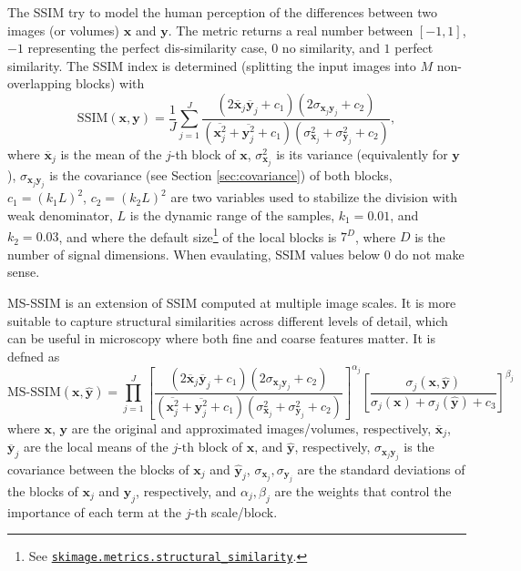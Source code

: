 The SSIM \cite{wang2004image} try to model the human perception of the
differences between two images (or volumes) $\mathbf{x}$ and
$\mathbf{y}$. The metric returns a real number between $[-1, 1]$, $-1$
representing the perfect dis-similarity case, $0$ no similarity, and
$1$ perfect similarity. The SSIM index is determined (splitting the
input images into $M$ non-overlapping blocks) with
\begin{equation}
  \text{SSIM}(\mathbf{x}, \mathbf{y}) = \frac{1}{J} \sum_{j=1}^J \frac{(2\overline{\mathbf{x}}_j \overline{\mathbf{y}}_j + c_1)(2\sigma_{\mathbf{x}_j \mathbf{y}_j} + c_2)}{(\overline{\mathbf{x}_j^2} + \overline{\mathbf{y}_j^2} + c_1)(\sigma^2_{\mathbf{x}_j} + \sigma^2_{\mathbf{y}_j} + c_2)},
\end{equation}
where $\overline{\mathbf x}_j$ is the mean of the $j$-th block of
$\mathbf{x}$, $\sigma^2_{\mathbf{x}_j}$ is its variance (equivalently
for $\mathbf{y}$), $\sigma_{\mathbf{x}_j\mathbf{y}_j}$ is the
covariance (see Section \ref{sec:covariance}) of both blocks,
$c_1=(k_1L)^2$, $c_2=(k_2L)^2$ are two variables used to stabilize the
division with weak denominator, $L$ is the dynamic range of the
samples, $k_1=0.01$, and $k_2=0.03$, and where the default
size\footnote{See
  \href{https://scikit-image.org/docs/stable/api/skimage.metrics.html\#skimage.metrics.structural_similarity}{\texttt{skimage.metrics.structural\_similarity}}.}
of the local blocks is $7^D$, where $D$ is the number of signal
dimensions. When evaulating, SSIM values below $0$ do not make
sense.

MS-SSIM \cite{wang2003multiscale} is an extension of SSIM computed at
multiple image scales. It is more suitable to capture structural
similarities across different levels of detail, which can be useful in
microscopy where both fine and coarse features matter. It is defned as
\begin{equation}
  \text{MS-SSIM}(\mathbf{x}, \hat{\mathbf{y}}) = \prod_{j=1}^{J} \left[ \frac{(2 \overline{\mathbf{x}}_j \overline{\mathbf{y}}_j + c_1)(2\sigma_{\mathbf{x}_j \mathbf{y}_j} + c_2)}{(\overline{\mathbf{x}_j^2} + \overline{\mathbf{y}_j^2} + c_1)(\sigma^2_{\mathbf{x}_j} + \sigma^2_{\mathbf{y}_j} + c_2)} \right]^{\alpha_j} \left[ \frac{\sigma_j(\mathbf{x}, \hat{\mathbf{y}})}{\sigma_j(\mathbf{x}) + \sigma_j(\hat{\mathbf{y}}) + c_3} \right]^{\beta_j}
\end{equation}
where $\mathbf{x}$, $\mathbf{y}$ are the original and approximated
images/volumes, respectively, $\overline{\mathbf{x}}_j$,
$\overline{\mathbf{y}}_j$ are the local means of the $j\text{-th}$
block of $\mathbf{x}$, and $\hat{\mathbf{y}}$, respectively,
$\sigma_{\mathbf{x}_j \mathbf{y}_j}$ is the covariance between the
blocks of $\mathbf{x}_j$ and $\hat{\mathbf{y}}_j$,
$\sigma_{\mathbf{x}_j}, \sigma_{\mathbf{y}_j}$ are the standard
deviations of the blocks of $\mathbf{x}_j$ and $\mathbf{y}_j$,
respectively, and $\alpha_j, \beta_j$ are the weights that control the
importance of each term at the $j\text{-th}$ scale/block.

